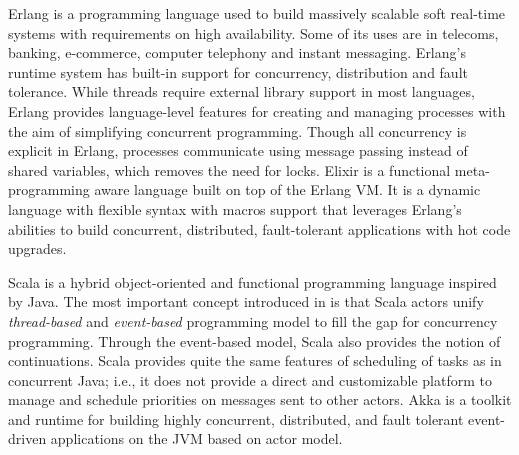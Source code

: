 Erlang \cite{Armstrong10Erlang} is a programming language used to build massively scalable soft real-time systems with requirements on high availability. 
Some of its uses are in telecoms, banking, e-commerce, computer telephony and instant messaging. Erlang's runtime system has built-in support for concurrency, distribution and fault tolerance.
While threads require external library support in most languages, Erlang provides language-level features for creating and managing processes with the aim of simplifying concurrent programming. 
Though all concurrency is explicit in Erlang, processes communicate using message passing instead of shared variables, which removes the need for locks.
Elixir \cite{elixir} is a functional meta-programming aware language built on top of the Erlang VM. It is a dynamic language with flexible syntax with macros support that leverages Erlang's abilities to build concurrent, distributed, fault-tolerant applications with hot code upgrades.

Scala is a hybrid object-oriented and functional programming language inspired by Java. 
The most important concept introduced in \cite{haller09tcs} is that Scala actors unify
\textit{thread-based} and \textit{event-based} programming model to fill the gap for concurrency programming. 
Through the event-based model, Scala also provides the notion of continuations. 
Scala provides quite the same features of scheduling of tasks as in concurrent Java; 
i.e., it does not provide a direct and customizable platform to manage and schedule priorities on messages sent to other actors.
Akka \cite{haller2012integration} is a toolkit and runtime for building highly concurrent, distributed, and fault tolerant event-driven applications on the JVM based on actor model.

